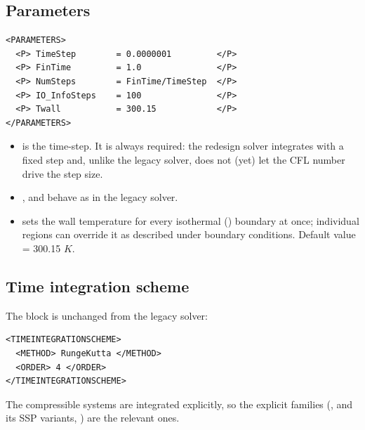 \subsection*{Parameters}
\begin{lstlisting}[style=XmlStyle]
<PARAMETERS>
  <P> TimeStep        = 0.0000001         </P>
  <P> FinTime         = 1.0               </P>
  <P> NumSteps        = FinTime/TimeStep  </P>
  <P> IO_InfoSteps    = 100               </P>
  <P> Twall           = 300.15            </P>
</PARAMETERS>
\end{lstlisting}
\begin{itemize}
\item {} is the time-step. It is always required: the
  redesign solver integrates with a fixed step and, unlike the legacy
  solver, does not (yet) let the CFL number drive the step size.
\item {},  and  behave as
  in the legacy solver.
\item {} sets the wall temperature for every isothermal
  () boundary at once; individual regions can override
  it as described under boundary conditions. Default value = 300.15 $K$.
\end{itemize}

\subsection*{Time integration scheme}
The  block is unchanged from the legacy
solver:
\begin{lstlisting}[style=XmlStyle]
<TIMEINTEGRATIONSCHEME>
  <METHOD> RungeKutta </METHOD>
  <ORDER> 4 </ORDER>
</TIMEINTEGRATIONSCHEME>
\end{lstlisting}
The compressible systems are integrated explicitly, so the explicit
families (,  and its SSP variants,
) are the relevant ones.

